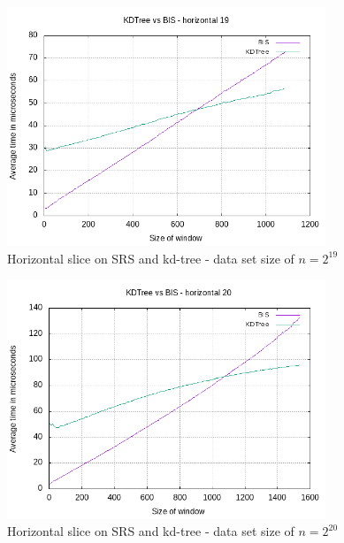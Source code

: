 \begin{figure}[h]
    \centering
    \includegraphics[width = 0.85\textwidth]{pictures/analysis/hori_19.png}
    \caption{Horizontal slice on SRS and kd-tree - data set size of $n=2^{19}$}\label{fig:hori_19}
\end{figure}

\begin{figure}[h]
    \centering
    \includegraphics[width = 0.85\textwidth]{pictures/analysis/hori_20.png}
    \caption{Horizontal slice on SRS and kd-tree - data set size of $n=2^{20}$}\label{fig:hori_20}
\end{figure}

